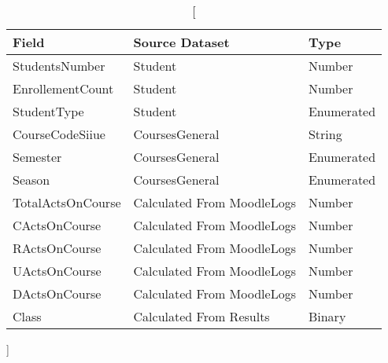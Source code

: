 \begin{table}[h!]
    \centering

    \begin{tabular}{| l | l | l |}
        \hline
        \textbf{Field}    & \textbf{Source Dataset}    & \textbf{Type} \\ \hline
        StudentsNumber    & Student                    & Number        \\ \hline
        EnrollementCount  & Student                    & Number        \\ \hline
        StudentType       & Student                    & Enumerated    \\ \hline
        CourseCodeSiiue   & CoursesGeneral             & String        \\ \hline
        Semester          & CoursesGeneral             & Enumerated    \\ \hline
        Season            & CoursesGeneral             & Enumerated    \\ \hline
        TotalActsOnCourse & Calculated From MoodleLogs & Number        \\ \hline
        CActsOnCourse     & Calculated From MoodleLogs & Number        \\ \hline
        RActsOnCourse     & Calculated From MoodleLogs & Number        \\ \hline
        UActsOnCourse     & Calculated From MoodleLogs & Number        \\ \hline
        DActsOnCourse     & Calculated From MoodleLogs & Number        \\ \hline
        Class             & Calculated From Results    & Binary        \\ \hline
    \end{tabular}

    \caption
        []
        {}

    \label{tab:exp_001}
\end{table}

%
%
%
%
%

